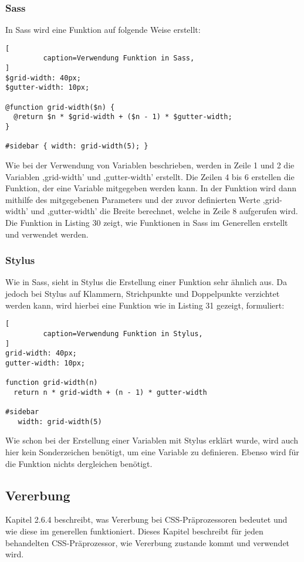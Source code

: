 \subsubsection{Sass}
In Sass wird eine Funktion auf folgende Weise erstellt:
\begin{lstlisting}[
         caption=Verwendung Funktion in Sass,
]
$grid-width: 40px;
$gutter-width: 10px;

@function grid-width($n) {
  @return $n * $grid-width + ($n - 1) * $gutter-width;
}

#sidebar { width: grid-width(5); }
\end{lstlisting}
Wie bei der Verwendung von Variablen beschrieben, werden in Zeile 1 und 2 die Variablen ,grid-width' und ,gutter-width' erstellt. Die Zeilen 4 bis 6 erstellen die Funktion, der eine Variable mitgegeben werden kann. In der Funktion wird dann mithilfe des mitgegebenen Parameters und der zuvor definierten Werte ,grid-width' und ,gutter-width' die Breite berechnet, welche in Zeile 8 aufgerufen wird.\newline
Die Funktion in Listing 30 zeigt, wie Funktionen in Sass im Generellen erstellt und verwendet werden.  
\subsubsection{Stylus}
Wie in Sass, sieht in Stylus die Erstellung einer Funktion sehr ähnlich aus. Da jedoch bei Stylus auf Klammern, Strichpunkte und Doppelpunkte verzichtet werden kann, wird hierbei eine Funktion wie in Listing 31 gezeigt, formuliert:
\begin{lstlisting}[
         caption=Verwendung Funktion in Stylus,
]
grid-width: 40px;
gutter-width: 10px;

function grid-width(n) 
  return n * grid-width + (n - 1) * gutter-width

#sidebar 
   width: grid-width(5)
\end{lstlisting}
Wie schon bei der Erstellung einer Variablen mit Stylus erklärt wurde, wird auch hier kein Sonderzeichen benötigt, um eine Variable zu definieren. Ebenso wird für die Funktion nichts dergleichen benötigt. \newline

\subsection{Vererbung}
Kapitel 2.6.4 beschreibt, was Vererbung bei CSS-Präprozessoren bedeutet und wie diese im generellen funktioniert. Dieses Kapitel beschreibt für jeden behandelten CSS-Präprozessor, wie Vererbung zustande kommt und verwendet wird.
